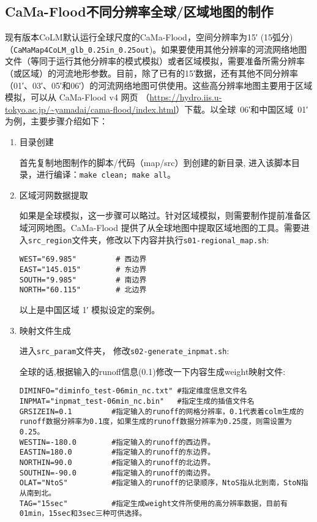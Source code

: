 \subsection{CaMa-Flood不同分辨率全球/区域地图的制作}
现有版本CoLM默认运行全球尺度的CaMa-Flood，空间分辨率为\ang{;15;} (15弧分)（\texttt{CaMaMap4CoLM\_glb\_0.25in\_0.25out})。如果要使用其他分辨率的河流网络地图文件（等同于运行其他分辨率的模式模拟）或者区域模拟，需要准备所需分辨率（或区域）的河流地形参数。目前，除了已有的\ang{;15;}数据，还有其他不同分辨率（\ang{;01;}、\ang{;03;}、\ang{;05;}和\ang{;06;}）的河流网络地图可供使用。这些高分辨率地图主要用于区域模拟，可以从 CaMa-Flood v4 网页 （\url{https://hydro.iis.u-tokyo.ac.jp/~yamadai/cama-flood/index.html}）下载。以全球~\ang{;06;}和中国区域~\ang{;01;}为例，主要步骤介绍如下：

\begin{enumerate}
\item 目录创建

首先复制地图制作的脚本/代码（map/src）到创建的新目录, 进入该脚本目录，进行编译：\verb|make clean; make all|。

\item 区域河网数据提取

如果是全球模拟，这一步骤可以略过。针对区域模拟，则需要制作提前准备区域河网地图。CaMa-Flood 提供了从全球地图中提取区域地图的工具。需要进入\texttt{src\_region}文件夹，修改以下内容并执行\texttt{s01-regional\_map.sh}:
\begin{lstlisting}
WEST="69.985"         # 西边界
EAST="145.015"        # 东边界
SOUTH="9.985"         # 南边界
NORTH="60.115"        # 北边界
\end{lstlisting}
以上是中国区域 \ang{;1;} 模拟设定的案例。

\item 映射文件生成

进入\texttt{src\_param}文件夹， 修改\texttt{s02-generate\_inpmat.sh}:

全球的话,根据输入的runoff信息(0.1\textdegree)修改一下内容生成weight映射文件:
\begin{lstlisting}
DIMINFO="diminfo_test-06min_nc.txt" #指定维度信息文件名
INPMAT="inpmat_test-06min_nc.bin"   #指定生成的插值文件名
GRSIZEIN=0.1         #指定输入的runoff的网格分辨率，0.1代表着colm生成的runoff数据分辨率为0.1度，如果生成的runoff数据分辨率为0.25度，则需设置为0.25。
WESTIN=-180.0        #指定输入的runoff的西边界。
EASTIN=180.0         #指定输入的runoff的东边界。
NORTHIN=90.0         #指定输入的runoff的北边界。
SOUTHIN=-90.0        #指定输入的runoff的南边界。
OLAT="NtoS"          #指定输入的runoff的记录顺序，NtoS指从北到南，StoN指从南到北。
TAG="15sec"          #指定生成weight文件所使用的高分辨率数据，目前有01min，15sec和3sec三种可供选择。
\end{lstlisting}


\end{enumerate}

